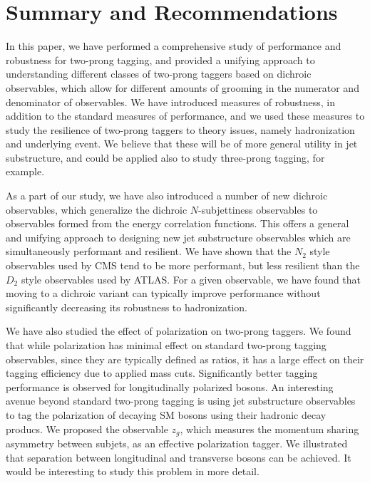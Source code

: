 \documentclass[11pt,letterpaper]{article}
\begin{document}
\section{Summary and Recommendations}\label{sec:conc}

In this paper, we have performed a comprehensive study of performance and robustness for two-prong tagging, and provided a unifying approach to understanding different classes of two-prong taggers based on dichroic observables, which allow for different amounts of grooming in the numerator and denominator of observables.  We have introduced measures of robustness, in addition to the standard measures of performance, and we used these measures to study the resilience of two-prong taggers to theory issues, namely hadronization and underlying event.  We believe that these will be of more general utility in jet substructure, and could be applied also to study three-prong tagging, for example.

As a part of our study, we have also introduced a number of new dichroic observables, which generalize the dichroic $N$-subjettiness observables to observables formed from the energy correlation functions. This offers a general and unifying approach to designing new jet substructure observables which are simultaneously performant and resilient. We have shown that the $N_2$ style observables used by CMS tend to be more performant, but less resilient than the $D_2$ style observables used by ATLAS. For a given observable, we have found that moving to a dichroic variant can typically improve performance without significantly decreasing its robustness to hadronization.

We have also studied the effect of polarization on two-prong taggers. We found that while polarization has minimal effect on standard two-prong tagging observables, since they are typically defined as ratios, it has a large effect on their tagging efficiency due to applied mass cuts. Significantly better tagging performance is observed for longitudinally polarized bosons. An interesting avenue beyond standard two-prong tagging is using jet substructure observables to tag the polarization of decaying SM bosons using their hadronic decay producs. We proposed the observable $z_g$, which measures the momentum sharing asymmetry between subjets, as an effective polarization tagger. We illustrated that separation between longitudinal and transverse bosons can be achieved. It would be interesting to study this problem in more detail.
\end{document}
